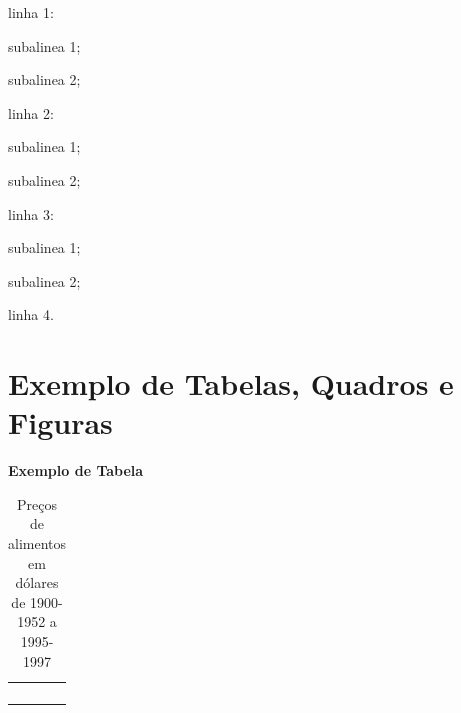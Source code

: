 \begin{alineas}
\item linha 1:
\begin{alineas}
\item subalinea 1;
\item subalinea 2;
\end{alineas}
\item linha 2:
\begin{subalineas}
\item subalinea 1;
\item subalinea 2;
\end{subalineas}
\item linha 3:
\begin{incisos}
\item subalinea 1;
\item subalinea 2;
\end{incisos}
\item linha 4.
\end{alineas}


\section{Exemplo de Tabelas, Quadros e Figuras}

{\centering\bfseries\color{red}
Exemplo de Tabela
\par}

\begin{table}[ht]
\centering
\caption{Preços de alimentos em dólares de 1900-1952 a
1995-1997}
\begin{supertabular}{m{3.6cm}m{3.7cm}m{3.6cm}m{3.0cm}}
\hline
{} &
 &
 &
\centering{}\\\hline
{} &
 &
 &
\centering{}\\
 &
 &
 &
\centering{}\\
 &
 &
 &
\centering{}\\
 &
 &
 &
\centering{}\\\hline
\end{supertabular}
    \label{tab:alimentos}
\end{table}

